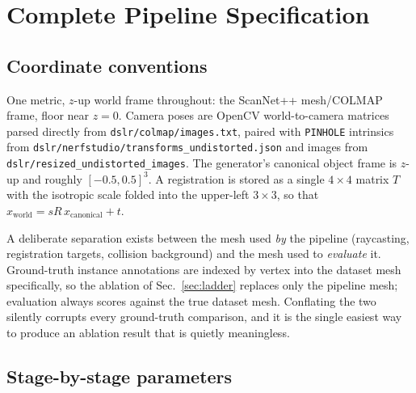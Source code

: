 
\section{Complete Pipeline Specification}
\label{app:spec}

\subsection{Coordinate conventions}
One metric, $z$-up world frame throughout: the ScanNet++ mesh/COLMAP
frame, floor near $z{=}0$. Camera poses are OpenCV world-to-camera
matrices parsed directly from \texttt{dslr/colmap/images.txt}, paired with
\texttt{PINHOLE} intrinsics from
\texttt{dslr/nerfstudio/transforms\_undistorted.json} and images from
\texttt{dslr/resized\_undistorted\_images}. The generator's canonical
object frame is $z$-up and roughly $[-0.5,0.5]^3$. A registration is
stored as a single $4{\times}4$ matrix $T$ with the isotropic scale
folded into the upper-left $3{\times}3$, so that
$x_{\text{world}} = sR\,x_{\text{canonical}} + t$.

A deliberate separation exists between the mesh used \emph{by} the
pipeline (raycasting, registration targets, collision background) and the
mesh used to \emph{evaluate} it. Ground-truth instance annotations are
indexed by vertex into the dataset mesh specifically, so the ablation of
Sec.~\ref{sec:ladder} replaces only the pipeline mesh; evaluation always
scores against the true dataset mesh. Conflating the two silently
corrupts every ground-truth comparison, and it is the single easiest way
to produce an ablation result that is quietly meaningless.

\subsection{Stage-by-stage parameters}

